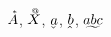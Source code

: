 \documentclass{article}
\begin{document}
	$ \accentset{*}{A} $,
	$ \accentset{@}{X} $,
	$ \underaccent{\check}{a} $,
	$ \underaccent{\hat}{b} $,
	$ \undertilde{abc} $
\end{document}

